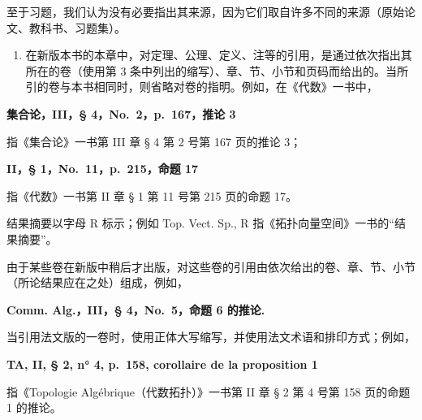 至于习题，我们认为没有必要指出其来源，因为它们取自许多不同的来源（原始论文、教科书、习题集）。

\begin{enumerate}
\def\labelenumi{\arabic{enumi}.}
\setcounter{enumi}{11}
\tightlist
\item
  在新版本书的本章中，对定理、公理、定义、注等的引用，是通过依次指出其所在的卷（使用第 3 条中列出的缩写）、章、节、小节和页码而给出的。当所引的卷与本书相同时，则省略对卷的指明。例如，在《代数》一书中，
\end{enumerate}

\textbf{集合论，III，§ 4，No.~2，p.~167，推论 3}

指《集合论》一书第 III 章 § 4 第 2 号第 167 页的推论 3；

\textbf{II，§ 1，No.~11，p.~215，命题 17}

指《代数》一书第 II 章 § 1 第 11 号第 215 页的命题 17。

结果摘要以字母 R 标示；例如 Top. Vect. Sp., R 指《拓扑向量空间》一书的``结果摘要''。

由于某些卷在新版中稍后才出版，对这些卷的引用由依次给出的卷、章、节、小节（所论结果应在之处）组成，例如，

\textbf{Comm. Alg.，III，§ 4，No.~5，命题 6 的推论.}

当引用法文版的一卷时，使用正体大写缩写，并使用法文术语和排印方式；例如，

\textbf{TA, II, § 2, n° 4, p.~158, corollaire de la proposition 1}

指《Topologie Algébrique（代数拓扑）》一书第 II 章 § 2 第 4 号第 158 页的命题 1 的推论。


